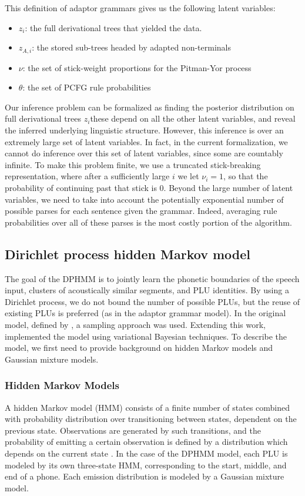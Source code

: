 \documentclass[12pt,letterpaper]{article}
\begin{document}
This definition of adaptor grammars gives us the following latent variables: 
\begin{itemize}
\item $z_i$: the full derivational trees that yielded the data. 
\item $z_{A,i}$: the stored sub-trees headed by adapted non-terminals
\item $\nu$: the set of stick-weight proportions for the Pitman-Yor process
\item $\theta$: the set of PCFG rule probabilities 
\end{itemize}
Our inference problem can be formalized as finding the posterior distribution on full derivational trees $z_i$\textemdash these depend on all the other latent variables, and reveal the inferred underlying linguistic structure. However, this inference is over an extremely large set of latent variables. In fact, in the current formalization, we cannot do inference over this set of latent variables, since some are countably infinite. To make this problem finite, we use a truncated stick-breaking representation, where after a sufficiently large $i$ we let $\nu_i = 1$, so that the probability of continuing past that stick is 0. Beyond the large number of latent variables, we need to take into account the potentially exponential number of possible parses for each sentence given the grammar. Indeed, averaging rule probabilities over all of these parses is the most costly portion of the algorithm. 

\subsection{Dirichlet process hidden Markov model}
The goal of the DPHMM is to jointly learn the phonetic boundaries of the speech input, clusters of acoustically similar segments, and PLU identities. By using a Dirichlet process, we do not bound the number of possible PLUs, but the reuse of existing PLUs is preferred (as in the adaptor grammar model). In the original model, defined by \citet{lee:2012}, a sampling approach was used. Extending this work, \citet{ondel:2016} implemented the model using variational Bayesian techniques. To describe the model, we first need to provide background on hidden Markov models and Gaussian mixture models.
\subsubsection{Hidden Markov Models}
A hidden Markov model (HMM) consists of a finite number of states combined with probability distribution over transitioning between states, dependent on the previous state. Observations are generated by such transitions, and the probability of emitting a certain observation is defined by a distribution which depends on the current state \citep{rabiner:1986}. In the case of the DPHMM model, each PLU is modeled by its own three-state HMM, corresponding to the start, middle, and end of a phone. Each emission distribution is modeled by a Gaussian mixture model. 
\end{document}
